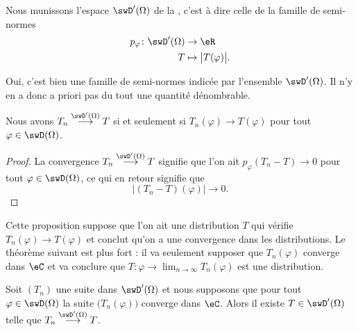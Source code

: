 \begin{definition}        \label{DefASmjVaT}
    Nous munissons l'espace \( \swD'(\Omega)\) de la , c'est à dire celle de la famille de semi-normes
    \begin{equation}
        \begin{aligned}
            p_{\varphi}\colon \swD'(\Omega)&\to \eR \\
            T&\mapsto \big| T(\varphi) \big|. 
        \end{aligned}
    \end{equation}
\end{definition}
Oui, c'est bien une famille de semi-normes indicée par l'ensemble \( \swD'(\Omega)\). Il n'y en a donc a priori pas du tout une quantité dénombrable.

\begin{proposition}  \label{PropEUIsNhD}
    Nous avons \( T_n\stackrel{\swD'(\Omega)}{\longrightarrow}T\) si et seulement si \( T_n(\varphi)\to T(\varphi)\) pour tout \( \varphi\in\swD(\Omega)\).
\end{proposition}

\begin{proof}
    La convergence \( T_n\stackrel{\swD'(\Omega)}{\longrightarrow}T\) signifie que l'on ait \( p_{\varphi}(T_n-T)\to 0\) pour tout \( \varphi\in\swD(\Omega)\), ce qui en retour signifie que
    \begin{equation}
        \big| (T_n-T)(\varphi) \big|\to 0.
    \end{equation}
\end{proof}
Cette proposition suppose que l'on ait une distribution \( T\) qui vérifie \( T_n(\varphi)\to T(\varphi)\) et conclut qu'on a une convergence dans les distributions. Le théorème suivant est plus fort : il va seulement supposer que \( T_n(\varphi)\) converge dans \( \eC\) et va conclure que \( T\colon \varphi\to \lim_{n\to \infty} T_n(\varphi)\) est une distribution.

\begin{theorem}
    Soit \( (T_n)\) une suite dans \( \swD'(\Omega)\) et nous supposons que pour tout \( \varphi\in\swD(\Omega)\) la suite \( \big( T_n(\varphi) \big)\) converge dans \( \eC\). Alors il existe \( T\in\swD'(\Omega)\) telle que \( T_n\stackrel{\swD'(\Omega)}{\longrightarrow}T\).
\end{theorem}


